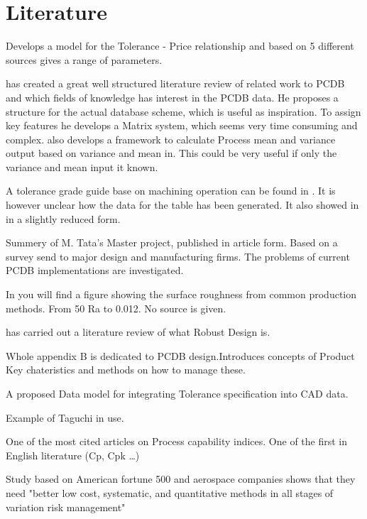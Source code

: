 \documentclass[aip,amsmath,reprint, author-year]{revtex4-1}
\begin{document}
\section{Literature}

\citet{sfantsikopoulos1990cost} Develops a model for the Tolerance - Price relationship and based on 5 different sources gives a range of parameters. 

\citet{kern2003forecasting} has created a great well structured literature review of related work to PCDB and which fields of knowledge has interest in the PCDB data. 
He proposes a structure for the actual database scheme, which is useful as inspiration. 
To assign key features he develops a Matrix system, which seems very time consuming and complex. 
\citet{kern2003forecasting} also develops a framework to calculate Process mean and variance output based on variance and mean in. 
This could be very useful if only the variance and mean input it known.

A tolerance grade guide base on machining operation can be found in \citet{american1978preferred}. It is however unclear how the data for the table has been generated. It also showed in \citet{united1967preferred} in a slightly reduced form.

\citet{tata1999process} Summery of M. Tata's Master project, published in article form. Based on a survey send to major design and manufacturing firms. The problems of current PCDB implementations are investigated. 

In \citet[p. 715]{oberg2008machinery} you will find a figure showing the surface roughness from common production methods. From 50 Ra to 0.012. No source is given.

\citet{arvidsson2008principles} has carried out a literature review of what Robust Design is.


\citet{thornton2004variation} Whole appendix B is dedicated to PCDB design.Introduces concepts of Product Key chateristics and methods on how to manage these.

\citet{feng1995dimension} A proposed Data model for integrating Tolerance specification into CAD data. 

\citet{yang1998design} Example of Taguchi in use. 

\citet{kane1986process} One of the most cited articles on Process capability indices. One of the first in English literature (Cp, Cpk …)

\citet{thornton2000more}Study based on American fortune 500 and aerospace companies shows that they need "better low cost, systematic, and quantitative methods in all stages of variation risk management"
\end{document}
